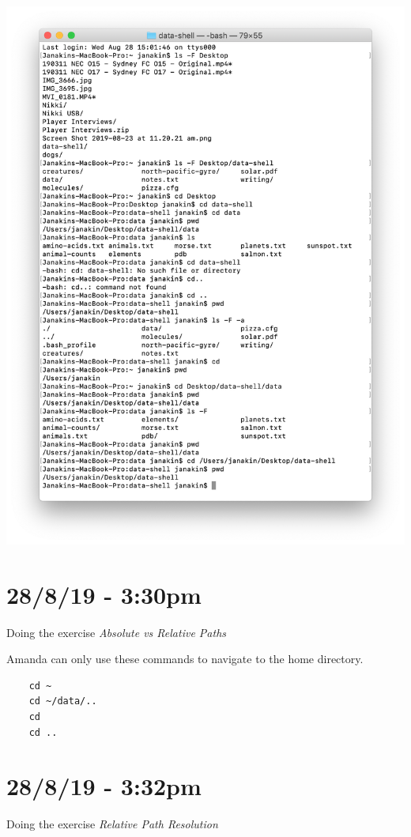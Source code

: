 \documentclass{article}
\begin{document}
\includegraphics[width=\textwidth]{figc.png}

\section*{28/8/19 - 3:30pm}

Doing the exercise \textit{Absolute vs Relative Paths}

Amanda can only use these commands to navigate to the home directory.

\begin{verbatim}
    cd ~
    cd ~/data/..
    cd
    cd ..
\end{verbatim}

\section*{28/8/19 - 3:32pm}

Doing the exercise \textit{Relative Path Resolution}
\end{document}
